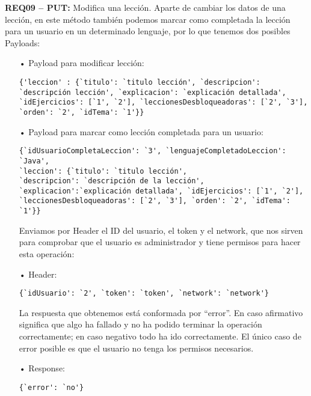 \textbf{REQ09 – PUT:} Modifica una lección. Aparte de cambiar los datos de una lección, en este método también podemos marcar como completada la lección para un usuario en un determinado lenguaje, por lo que tenemos dos posibles Payloads:

\begin{itemize}
\item[•]Payload para modificar lección:
{\codesize
\begin{verbatim}
{'leccion' : {`titulo': `titulo lección', `descripcion': 
`descripción lección', `explicacion': `explicación detallada', 
`idEjercicios': [`1', `2'], `leccionesDesbloqueadoras': [`2', `3'], 
`orden': `2', `idTema': `1'}}
\end{verbatim}
}

\item[•]
Payload para marcar como lección completada para un usuario:
{\codesize
\begin{verbatim}
{`idUsuarioCompletaLeccion': `3', `lenguajeCompletadoLeccion': `Java', 
`leccion': {`titulo': `titulo lección', 
`descripcion': `descripción de la lección', 
`explicacion':`explicación detallada', `idEjercicios': [`1', `2'], 
`leccionesDesbloqueadoras': [`2', `3'], `orden': `2', `idTema': `1'}}
\end{verbatim}
}

Enviamos por Header el ID del usuario, el token y el network, que nos sirven para comprobar que el usuario es administrador y tiene permisos para hacer esta operación:

\item[•]Header:
{\codesize
\begin{verbatim}
{`idUsuario': `2', `token': `token', `network': `network'}
\end{verbatim}
}

La respuesta que obtenemos está conformada por ``error''. En caso afirmativo significa que algo ha fallado y no ha podido terminar la operación correctamente; en caso negativo todo ha ido correctamente. El único caso de error posible es que el usuario no tenga los permisos necesarios.
\item[•]Response:
{\codesize
\begin{verbatim} 
{`error': `no'}
\end{verbatim}
}
\end{itemize}

